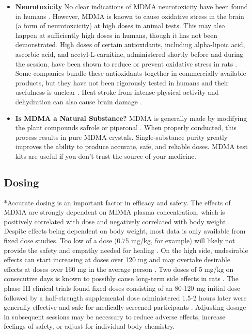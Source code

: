\documentclass[12pt,letterpaper]{article}
\begin{document}
\begin{itemize}
    \item \textbf{Neurotoxicity}
        No clear indications of MDMA neurotoxicity have been found in humans \cite{passieHistory,halpernMormonRavers}. However, MDMA is known to cause oxidative stress in the brain (a form of neurotoxcicity) at high doses in animal tests. This may also happen at sufficiently high doses in humans, though it has not been demonstrated. High doses of certain antioxidants, including alpha-lipoic acid, ascorbic acid, and acetyl-L-carnitine, administered shortly before and during the session, have been shown to reduce or prevent oxidative stress in rats \cite{aguirre1999alpha,shankaran2001ascorbic,alves2009acetyl}. Some companies bundle these antioxidants together in commercially available products, but they have not been rigorously tested in humans and their usefulness is unclear \cite{rollKit}. Heat stroke from intense physical activity and dehydration can also cause brain damage \cite{yeoHeatStroke}.
    \item \textbf{Is MDMA a Natural Substance?}
        MDMA is generally made by modifying the plant compounds safrole or piperonal \cite{worldDrugReport}. When properly conducted, this process results in pure MDMA crystals. Single-substance purity greatly improves the ability to produce accurate, safe, and reliable doses. MDMA test kits are useful if you don't trust the source of your medicine. 
\end{itemize}
\subsection{Dosing}
\label{sec:dosing}
*Accurate dosing is an important factor in efficacy and safety. The effects of MDMA are strongly dependent on MDMA plasma concentration, which is positively correlated with dose and negatively correlated with body weight \cite{studerusResponse}. Despite effects being dependent on body weight, most data is only available from fixed dose studies. Too low of a dose (0.75 mg/kg, for example) will likely not provide the safety and empathy needed for healing \cite{bediMDMALowDose}. On the high side, undesirable effects can start increasing at doses over 120 mg and may overtake desirable effects at doses over 160 mg in the average person \cite{bruntLinking}. Two doses of 5 mg/kg on consecutive days is known to possibly cause long-term side effects in rats \cite{baumannRats}. The phase III clinical trials found fixed doses consisting of an 80-120 mg initial dose followed by a half-strength supplemental dose administered 1.5-2 hours later were generally effective and safe for medically screened participants \cite{mitchellMDMAClinicalTrial2}. Adjusting dosage in subsequent sessions may be necessary to reduce adverse effects, increase feelings of safety, or adjust for individual body chemistry.
\end{document}
